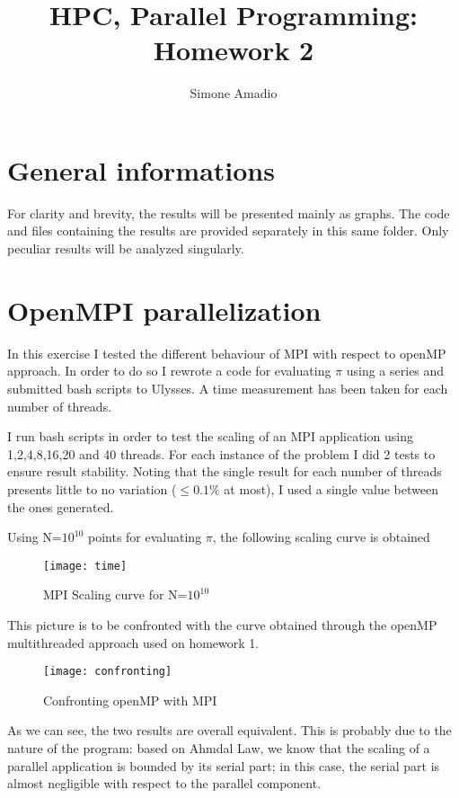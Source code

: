 \documentclass[10pt,a4paper]{article}
\begin{document}
\author{Simone Amadio}
\title{HPC, Parallel Programming:\\Homework 2}
\date{}
\maketitle

\section*{General informations}

For clarity and brevity, the results will be presented mainly as graphs. The code and files containing the results are provided separately in this same folder. Only peculiar results will be analyzed singularly.

\section{OpenMPI parallelization}
In this exercise I tested the different behaviour of MPI with respect to openMP approach. In order to do so I rewrote a code for evaluating $\pi$ using a series and submitted bash scripts to Ulysses. A time measurement has been taken for each number of threads.

I run bash scripts in order to test the scaling of an MPI application using 1,2,4,8,16,20 and 40 threads. For each instance of the problem I did 2 tests to ensure result stability. Noting that the single result for each number of threads presents little to no variation ($\leq 0.1\%$ at most), I used a single value between the ones generated.

Using N=$10^{10}$ points for evaluating $\pi$, the following scaling curve is obtained

\begin{figure}[h!]
	\centering
	\texttt{[image: time]}
	\caption*{MPI Scaling curve for N=$10^{10}$}
	\label{fig:time}
\end{figure}

This picture is to be confronted with the curve obtained through the openMP multithreaded approach used on homework 1.

\begin{figure}
	\centering
	\texttt{[image: confronting]}
	\caption*{Confronting openMP with MPI}
	\label{fig:confronting}
\end{figure}

As we can see, the two results are overall equivalent. This is probably due to the nature of the program: based on Ahmdal Law, we know that the scaling of a parallel application is bounded by its serial part; in this case, the serial part is almost negligible with respect to the parallel component.
\end{document}
